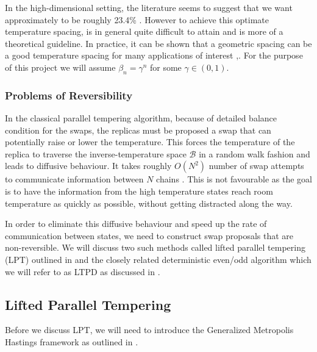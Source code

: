 \documentclass[12pt]{article}
\begin{document}
In the high-dimensional setting, the literature seems to suggest that we want approximately to be roughly 23.4\%  \cite{atchade_towards_2011}. However to achieve this optimate temperature spacing, is in general quite difficult to attain and is more of a theoretical guideline. In practice, it can be shown that a geometric spacing can be a good temperature spacing for many applications of interest \cite{atchade_towards_2011},\cite{kofke2002acceptance}. For the purpose of this project we will assume $\beta_n=\gamma^n$ for some $\gamma\in (0,1)$.
\subsubsection{Problems of Reversibility}
In the classical parallel tempering algorithm, because of detailed balance condition for the swaps, the replicas must be proposed a swap that can potentially raise or lower the temperature. This forces the temperature of the replica to traverse the inverse-temperature space $\mathcal{B}$ in a random walk fashion and leads to diffusive behaviour. It takes roughly $O(N^2)$ number of swap attempts  to communicate information between $N$ chains \cite{diaconis2000analysis}. This is not favourable as the goal is to have the information from the high temperature states reach room temperature as quickly as possible, without getting distracted along the way. 

In order to eliminate this diffusive behaviour and speed up the rate of communication between states, we need to construct swap proposals that are non-reversible. We will discuss two such methods called lifted parallel tempering (LPT) outlined in \cite{wu_irreversible_2017} and the closely related deterministic even/odd algorithm which we will refer to as LTPD as discussed in \cite{lingenheil2009efficiency}. 

\subsection{Lifted Parallel Tempering}
Before we discuss LPT, we will need to introduce the Generalized Metropolis Hastings framework as outlined in \cite{stoltz2010free}.
\end{document}
